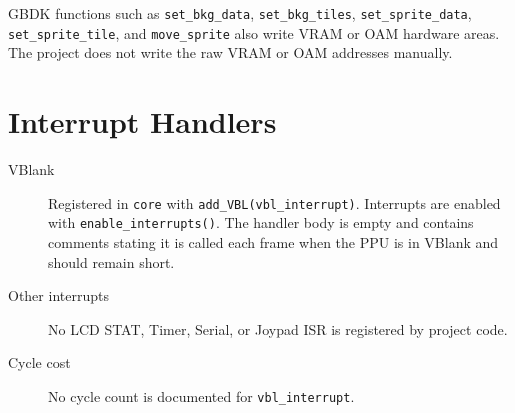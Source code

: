 GBDK functions such as \texttt{set\_bkg\_data}, \texttt{set\_bkg\_tiles}, \texttt{set\_sprite\_data}, \texttt{set\_sprite\_tile}, and \texttt{move\_sprite} also write VRAM or OAM hardware areas. The project does not write the raw VRAM or OAM addresses manually.

\section{Interrupt Handlers}

\begin{description}
  \item[VBlank] Registered in \texttt{core} with \texttt{add\_VBL(vbl\_interrupt)}. Interrupts are enabled with \texttt{enable\_interrupts()}. The handler body is empty and contains comments stating it is called each frame when the PPU is in VBlank and should remain short.
  \item[Other interrupts] No LCD STAT, Timer, Serial, or Joypad ISR is registered by project code.
  \item[Cycle cost] No cycle count is documented for \texttt{vbl\_interrupt}.
\end{description}
